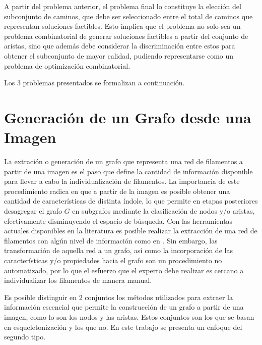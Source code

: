 A partir del problema anterior, el problema final lo constituye la elecci\'on del subconjunto de caminos, que debe ser seleccionado entre el total de caminos que representan soluciones factibles. Esto implica que el problema no solo sea un problema combinatorial de generar soluciones factibles a partir del conjunto de aristas, sino que adem\'as debe considerar la discriminaci\'on entre estos para obtener el subconjunto de mayor calidad, pudiendo representarse como un problema de optimizaci\'on combinatorial.

Los 3 problemas presentados se formalizan a continuaci\'on.


\section{Generaci\'on de un Grafo desde una Imagen}
La extraci\'on o generaci\'on de un grafo que representa una red de filamentos a partir de una imagen es el paso que define la cantidad de informaci\'on disponible para llevar a cabo la individualizaci\'on de filamentos. La importancia de este procedimiento radica en que a partir de la imagen es posible obtener una cantidad de caracter\'isticas de distinta \'indole, lo que permite en etapas posteriores desagregar el grafo $G$ en subgrafos mediante la clasificaci\'on de nodos y/o aristas, efectivamente disminuyendo el espacio de b\'usqueda. Con las herramientas actuales disponibles en la literatura es posible realizar la extracci\'on de una red de filamentos con algún nivel de informaci\'on como en \cite{xu2015soax}. Sin embargo, las transformaci\'on de aquella red a un grafo, as\'i como la incorporaci\'on de las caracter\'isticas y/o propiedades hacia el grafo son un procedimiento no automatizado, por lo que el esfuerzo que el experto debe realizar es cercano a individualizar los filamentos de manera manual.

Es posible distinguir en 2 conjuntos los m\'etodos utilizados para extraer la informaci\'on escencial que permite la construcci\'on de un grafo a partir de una imagen, como lo son los nodos y las aristas. Estos conjuntos son los que se basan en esqueletonizaci\'on\cite{lavado2018comparacion} y los que no. En este trabajo se presenta un enfoque del segundo tipo.


